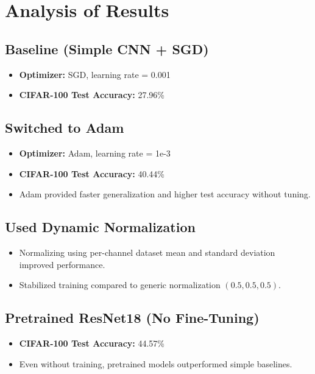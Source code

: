 


\section*{Analysis of Results}

\subsection*{Baseline (Simple CNN + SGD)}
\begin{itemize}
    \item \textbf{Optimizer:} SGD, learning rate = 0.001
    \item \textbf{CIFAR-100 Test Accuracy:} 27.96\%
\end{itemize}

\subsection*{Switched to Adam}
\begin{itemize}
    \item \textbf{Optimizer:} Adam, learning rate = 1e-3
    \item \textbf{CIFAR-100 Test Accuracy:} 40.44\%
    \item Adam provided faster generalization and higher test accuracy without tuning.
\end{itemize}

\subsection*{Used Dynamic Normalization}
\begin{itemize}
    \item Normalizing using per-channel dataset mean and standard deviation improved performance.
    \item Stabilized training compared to generic normalization $(0.5, 0.5, 0.5)$.
\end{itemize}

\subsection*{Pretrained ResNet18 (No Fine-Tuning)}
\begin{itemize}
    \item \textbf{CIFAR-100 Test Accuracy:} 44.57\%
    \item Even without training, pretrained models outperformed simple baselines.
\end{itemize}

